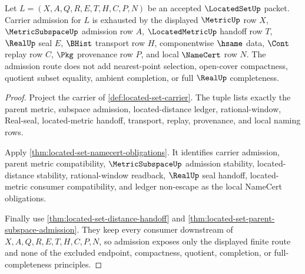 \begin{theorem}
\label{thm:located-set-carrier-admission}
Let $L=(X,A,Q,R,E,T,H,C,P,N)$ be an accepted $\LocatedSetUp$ packet. Carrier admission for $L$ is exhausted by the displayed $\MetricUp$ row $X$, $\MetricSubspaceUp$ admission row $A$, $\LocatedMetricUp$ handoff row $T$, $\RealUp$ seal $E$, $\BHist$ transport row $H$, componentwise $\hsame$ data, $\Cont$ replay row $C$, $\Pkg$ provenance row $P$, and local $\NameCert$ row $N$. The admission route does not add nearest-point selection, open-cover compactness, quotient subset equality, ambient completion, or full $\RealUp$ completeness.
\end{theorem}
\begin{proof}
Project the carrier of \autoref{def:located-set-carrier}. The tuple lists exactly the parent metric, subspace admission, located-distance ledger, rational-window, Real-seal, located-metric handoff, transport, replay, provenance, and local naming rows.

Apply \autoref{thm:located-set-namecert-obligations}. It identifies carrier admission, parent metric compatibility, $\MetricSubspaceUp$ admission stability, located-distance stability, rational-window readback, $\RealUp$ seal handoff, located-metric consumer compatibility, and ledger non-escape as the local NameCert obligations.

Finally use \autoref{thm:located-set-distance-handoff} and \autoref{thm:located-set-parent-subspace-admission}. They keep every consumer downstream of $X,A,Q,R,E,T,H,C,P,N$, so admission exposes only the displayed finite route and none of the excluded endpoint, compactness, quotient, completion, or full-completeness principles.
\end{proof}

